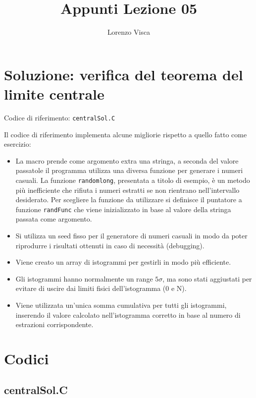 \documentclass[10pt]{article}
\title{Appunti Lezione 05}
\author{Lorenzo Visca}
\date{}
\newcommand{\ttt}{\texttt}
\begin{document}
\maketitle

\section{Soluzione: verifica del teorema del limite centrale}
Codice di riferimento: \ttt{centralSol.C} \vspace{10pt}

Il codice di riferimento implementa alcune migliorie rispetto a quello fatto come esercizio:

\begin{itemize}
    \item La macro prende come argomento extra una stringa, a seconda del valore passatole il programma utilizza una diversa funzione per generare i numeri casuali.
          La funzione \ttt{randomlong}, presentata a titolo di esempio, è un metodo più inefficiente che rifiuta i numeri estratti se non rientrano nell'intervallo desiderato.
          Per scegliere la funzione da utilizzare si definisce il puntatore a funzione \ttt{randFunc} che viene inizializzato in base al valore della stringa passata come argomento.
    \item Si utilizza un seed fisso per il generatore di numeri casuali in modo da poter riprodurre i risultati ottenuti in caso di necessità (debugging).
    \item Viene creato un array di istogrammi per gestirli in modo più efficiente.
    \item Gli istogrammi hanno normalmente un range $5\sigma$, ma sono stati aggiustati per evitare di uscire dai limiti fisici dell'istogramma (0 e N).
    \item Viene utilizzata un'unica somma cumulativa per tutti gli istogrammi, inserendo il valore calcolato nell'istogramma corretto in base al numero di estrazioni corrispondente.
\end{itemize}

\newpage

\newpage
\section{Codici}

\subsection{centralSol.C}

\end{document}
